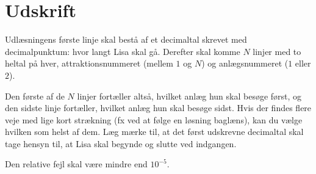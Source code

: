 \section*{Udskrift}
Udlæsningens første linje skal bestå af et decimaltal skrevet med decimalpunktum: hvor langt Lisa skal gå. 
Derefter skal komme $N$ linjer med to heltal på hver, attraktionsnummeret (mellem $1$ og $N$) og anlægsnummeret ($1$ eller $2$).

Den første af de $N$ linjer fortæller altså, hvilket anlæg hun skal besøge først, og den sidste linje fortæller, hvilket anlæg hun skal besøge sidst.
Hvis der findes flere veje med lige kort strækning (fx ved at følge en løsning baglæns), kan du vælge hvilken som helst af dem.
Læg mærke til, at det først udskrevne decimaltal skal tage hensyn til, at Lisa skal begynde og slutte ved indgangen.

Den relative fejl skal være mindre end $10^{-5}$.
